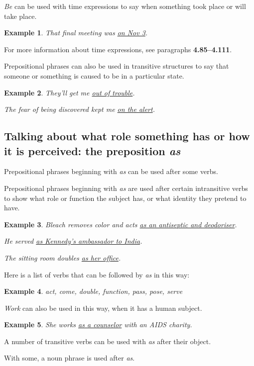 \documentclass[oneside]{book}
\numberwithin{equation}{section}
\newtheorem{example}{Example}[section]
\begin{document}
%
\noindent{} \textit{Be} can be used with time expressions to say when something took place or will take place.
\begin{example}
    That final meeting was \underline{on Nov 3}.
\end{example}
For more information about time expressions, see paragraphs \textbf{4.85--4.111}.

%
\noindent{} Prepositional phrases can also be used in transitive structures to say that someone or something is caused to be in a particular state.
\begin{example}
    They'll get me \underline{out of trouble}.
    
    The fear of being discovered kept me \underline{on the alert}.
\end{example}

\subsection{Talking about what role something has or how it is perceived: the preposition \textit{as}}
\noindent{} Prepositional phrases beginning with \textit{as} can be used after some verbs.

%
\noindent{} Prepositional phrases beginning with \textit{as} are used after certain intransitive verbs to show what role or function the subject has, or what identity they pretend to have.
\begin{example}
    Bleach removes color and acts \underline{as an antiseptic and deodoriser}.
    
    He served \underline{as Kennedy's ambassador to India}.
    
    The sitting room doubles \underline{as her office}.
\end{example}
Here is a list of verbs that can be followed by \textit{as} in this way:
\begin{example}
    act, come, double, function, pass, pose, serve
\end{example}
\textit{Work} can also be used in this way, when it has a human subject.
\begin{example}
    She works \underline{as a counselor} with an AIDS charity.
\end{example}
%
\noindent{} A number of transitive verbs can be used with \textit{as} after their object.

%
With some, a noun phrase is used after \textit{as}.
\end{document}
